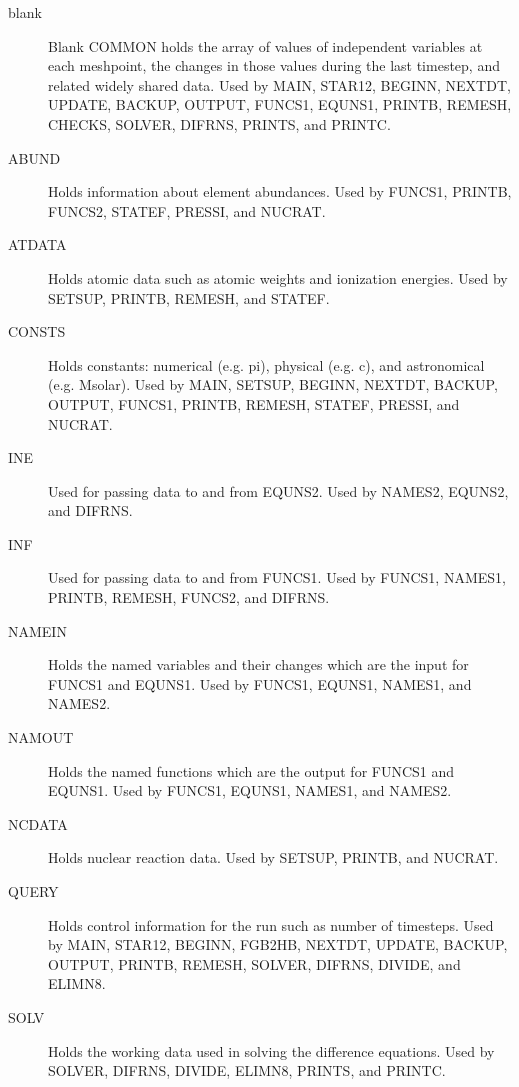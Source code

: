 \documentclass{article}
\begin{document}
\begin{description}
\item[blank]
		Blank COMMON holds the array of values of independent variables at each meshpoint,
		the changes in those values during the last timestep, and related widely shared data.
    		Used by MAIN, STAR12, BEGINN, NEXTDT, UPDATE, BACKUP, OUTPUT, FUNCS1, 
	        EQUNS1, PRINTB, REMESH, CHECKS, SOLVER, DIFRNS, PRINTS, and PRINTC.
			        
\item[ABUND] Holds information about element abundances.
    Used by FUNCS1, PRINTB, FUNCS2, STATEF, PRESSI, and NUCRAT.

\item[ATDATA] Holds atomic data such as atomic weights and ionization energies.
    Used by SETSUP, PRINTB, REMESH, and STATEF.

\item[CONSTS] Holds constants: numerical (e.g. pi), physical (e.g. c), and astronomical (e.g. Msolar).
    Used by MAIN, SETSUP, BEGINN, NEXTDT, BACKUP, OUTPUT,
	        FUNCS1, PRINTB, REMESH, STATEF, PRESSI, and NUCRAT.

\item[INE]  Used for passing data to and from EQUNS2.
    Used by NAMES2, EQUNS2, and DIFRNS.

\item[INF] Used for passing data to and from FUNCS1.
    Used by FUNCS1, NAMES1, PRINTB, REMESH, FUNCS2, and DIFRNS.

\item[NAMEIN] Holds the named variables and their changes which are the input for FUNCS1 and EQUNS1.
    Used by FUNCS1, EQUNS1, NAMES1, and NAMES2.

\item[NAMOUT] Holds the named functions which are the output for FUNCS1 and EQUNS1.
    Used by FUNCS1, EQUNS1, NAMES1, and NAMES2.

\item[NCDATA] Holds nuclear reaction data.
    Used by SETSUP, PRINTB, and NUCRAT.

\item[QUERY] Holds control information for the run such as number of timesteps.
    Used by MAIN, STAR12, BEGINN, FGB2HB, NEXTDT, UPDATE, BACKUP, OUTPUT, PRINTB,
	        REMESH, SOLVER, DIFRNS, DIVIDE, and ELIMN8.

\item[SOLV] Holds the working data used in solving the difference equations.
    Used by SOLVER, DIFRNS, DIVIDE, ELIMN8, PRINTS, and PRINTC.


\end{description}
\end{document}
